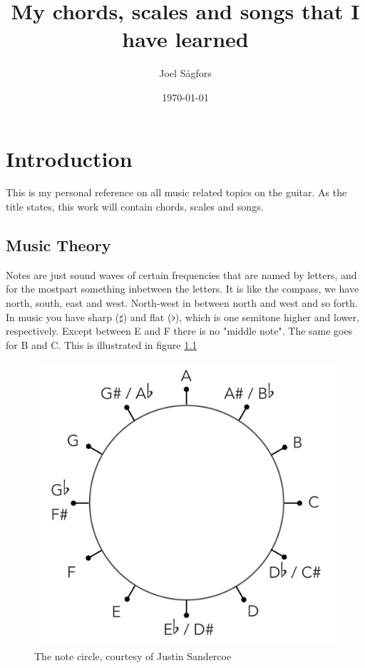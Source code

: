 \documentclass[11pt]{book}
\title{My chords, scales and songs that I have learned}
\author{Joel Sågfors}
\date{\today}
\begin{document}
    \maketitle


    \chapter{Introduction}
    This is my personal reference on all music related topics on the guitar.
    As the title states, this work will contain chords, scales and songs.


    \section{Music Theory}
    Notes are just sound waves of certain frequencies that are named by letters, and for the mostpart something inbetween the letters.
    It is like the compass, we have north, south, east and west.
    North-west in between north and west and so forth.
    In music you have sharp ($\sharp$) and flat ($\flat$), which is one semitone higher and lower, respectively.
    Except between E and F there is no "middle note".
    The same goes for B and C.
    This is illustrated in figure \ref{fig:note_circle}

    \begin{figure}[h]
        \includegraphics[width=\textwidth]{note_circle.png}
        \caption{The note circle, courtesy of Justin Sandercoe}
        \label{fig:note_circle}
    \end{figure}
\end{document}
